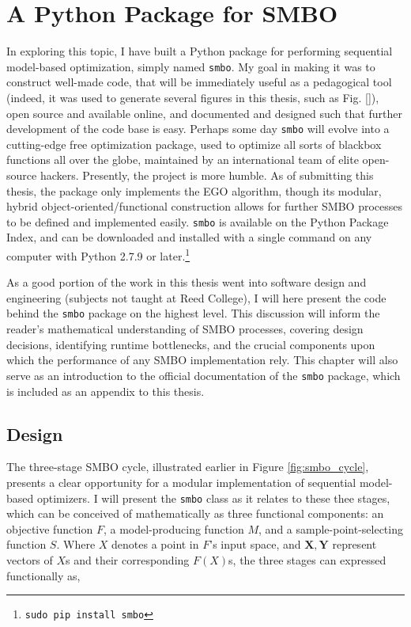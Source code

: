\chapter{A Python Package for SMBO} \label{ch:code}


In exploring this topic, I have built a Python package for performing sequential model-based optimization, simply named \texttt{smbo}. My goal in making it was to construct well-made code, that will be immediately useful as a pedagogical tool (indeed, it was used to generate several figures in this thesis, such as Fig. \ref{}), open source and available online, and documented and designed such that further development of the code base is easy. Perhaps some day \texttt{smbo} will evolve into a cutting-edge free optimization package, used to optimize all sorts of blackbox functions all over the globe, maintained by an international team of elite open-source hackers. Presently, the project is more humble. As of submitting this thesis, the package only implements the EGO algorithm, though its modular, hybrid object-oriented/functional construction allows for further SMBO processes to be defined and implemented easily. \texttt{smbo} is available on the Python Package Index, and can be downloaded and installed with a single command on any computer with Python 2.7.9 or later.\footnote{\texttt{sudo pip install smbo}}

As a good portion of the work in this thesis went into software design and engineering (subjects not taught at Reed College), I will here present the code behind the \texttt{smbo} package on the highest level. This discussion will inform the reader's mathematical understanding of SMBO processes, covering design decisions, identifying runtime bottlenecks, and the crucial components upon which the performance of any SMBO implementation rely. This chapter will also serve as an introduction to the official documentation of the \texttt{smbo} package, which is included as an appendix to this thesis.

\section{Design}\label{sec:design}

The three-stage SMBO cycle, illustrated earlier in Figure \ref{fig:smbo_cycle}, presents a clear opportunity for a modular implementation of sequential model-based optimizers. I will present the \texttt{smbo} class as it relates to these thee stages, which can be conceived of mathematically as three functional components: an objective function $F$, a model-producing function $M$, and a sample-point-selecting function $S$. Where $X$ denotes a point in $F$'s input space, and $\mathbf{X},\mathbf{Y}$ represent vectors of $X$s and their corresponding $F(X)$s, the three stages can expressed functionally as,

